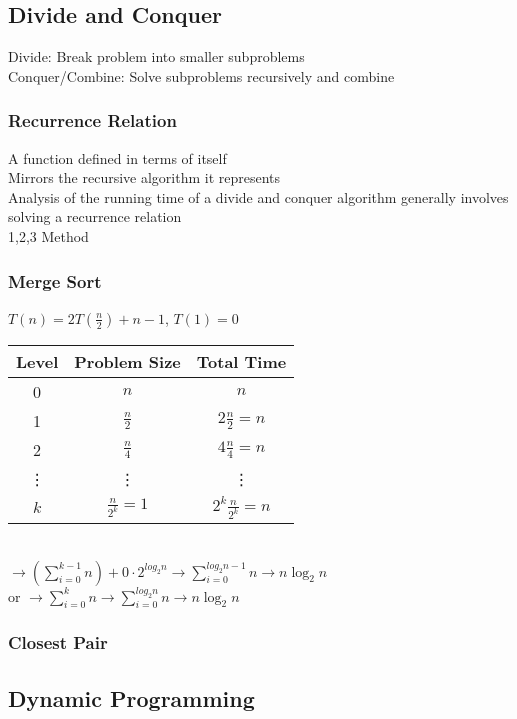 \documentclass{article}
\begin{document}
\begin{multicols*}{2}
        \subsection*{Divide and Conquer}
        Divide: Break problem into smaller subproblems\\
        Conquer/Combine: Solve subproblems recursively and combine
        \subsubsection*{Recurrence Relation}
        A function defined in terms of itself\\
        Mirrors the recursive algorithm it represents\\
        Analysis of the running time of a divide and conquer algorithm generally involves
        solving a recurrence relation\\
        1,2,3 Method
        \subsubsection*{Merge Sort}
        $T(n) = 2T(\frac{n}{2}) + n-1$, $T(1) = 0$\\
        \begin{tabular}{c|c|c}
            Level  & Problem Size        & Total Time               \\
            \hline
            0      & $n$                 & $n$                      \\
            1      & $\frac{n}{2}$       & $2\frac{n}{2} = n$       \\
            2      & $\frac{n}{4}$       & $4\frac{n}{4} = n$       \\
            \vdots & \vdots              & \vdots                   \\
            $k$    & $\frac{n}{2^k} = 1$ & $2^{k}\frac{n}{2^k} = n$ \\
        \end{tabular}\\
        $\to (\sum\limits_{i=0}^{k-1} n) + 0 \cdot 2^{log_2 n} \to \sum\limits_{i=0}^{log_2 n -
        1} n \to n\log_2 n$\\
        or $\to \sum\limits_{i=0}^{k} n \to \sum\limits_{i=0}^{log_2 n} n \to n\log_2 n$
        \subsubsection*{Closest Pair}
        \subsection*{Dynamic Programming}

\end{multicols*}
\end{document}
